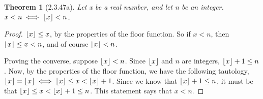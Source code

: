 \documentclass[a4paper, 12pt]{article}
\theoremstyle{plain}
\newtheorem*{theorem*}{Theorem}
\DeclarePairedDelimiter{\floor}{\lfloor}{\rfloor}
\begin{document}
	
	\begin{theorem*}[2.3.47a]
		Let x be a real number, and let n be an integer. \newline $x < n \iff \floor{x} < n$.
	\end{theorem*}
	
	\begin{proof}
		$\floor{x} \le x$, by the properties of the floor function. So if $x < n$, then $\floor{x} \le x < n$, and of course $\floor{x} < n$.
		
		Proving the converse, suppose $\floor{x} < n$. Since $\floor{x}$ and $n$ are integers, $\floor{x} + 1 \le n$. Now, by the properties of the floor function, we have the following tautology, $\floor{x} = \floor{x} \iff \floor{x} \le x < \floor{x} + 1$. Since we know that $\floor{x} + 1 \le n$, it must be that $\floor{x} \le x < \floor{x} + 1 \le n$. This statement says that $x < n$.
	\end{proof}
\end{document}
